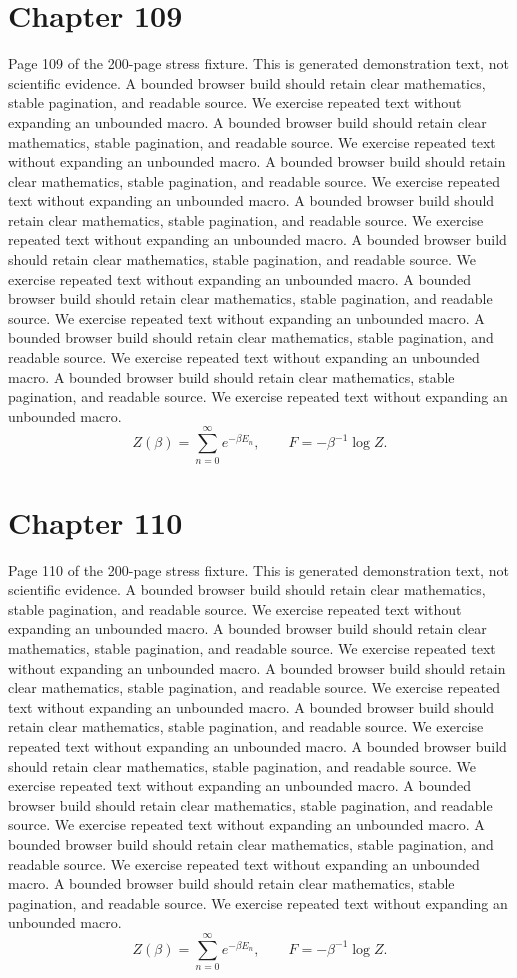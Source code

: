 \documentclass[11pt]{article}
\begin{document}
\section*{Chapter 109}
Page 109 of the 200-page stress fixture. This is generated demonstration text, not scientific evidence.
A bounded browser build should retain clear mathematics, stable pagination, and readable source. We exercise repeated text without expanding an unbounded macro.
A bounded browser build should retain clear mathematics, stable pagination, and readable source. We exercise repeated text without expanding an unbounded macro.
A bounded browser build should retain clear mathematics, stable pagination, and readable source. We exercise repeated text without expanding an unbounded macro.
A bounded browser build should retain clear mathematics, stable pagination, and readable source. We exercise repeated text without expanding an unbounded macro.
A bounded browser build should retain clear mathematics, stable pagination, and readable source. We exercise repeated text without expanding an unbounded macro.
A bounded browser build should retain clear mathematics, stable pagination, and readable source. We exercise repeated text without expanding an unbounded macro.
A bounded browser build should retain clear mathematics, stable pagination, and readable source. We exercise repeated text without expanding an unbounded macro.
A bounded browser build should retain clear mathematics, stable pagination, and readable source. We exercise repeated text without expanding an unbounded macro.
\[Z(\beta)=\sum_{n=0}^{\infty}e^{-\beta E_n},\qquad F=-\beta^{-1}\log Z.\]
\newpage
\section*{Chapter 110}
Page 110 of the 200-page stress fixture. This is generated demonstration text, not scientific evidence.
A bounded browser build should retain clear mathematics, stable pagination, and readable source. We exercise repeated text without expanding an unbounded macro.
A bounded browser build should retain clear mathematics, stable pagination, and readable source. We exercise repeated text without expanding an unbounded macro.
A bounded browser build should retain clear mathematics, stable pagination, and readable source. We exercise repeated text without expanding an unbounded macro.
A bounded browser build should retain clear mathematics, stable pagination, and readable source. We exercise repeated text without expanding an unbounded macro.
A bounded browser build should retain clear mathematics, stable pagination, and readable source. We exercise repeated text without expanding an unbounded macro.
A bounded browser build should retain clear mathematics, stable pagination, and readable source. We exercise repeated text without expanding an unbounded macro.
A bounded browser build should retain clear mathematics, stable pagination, and readable source. We exercise repeated text without expanding an unbounded macro.
A bounded browser build should retain clear mathematics, stable pagination, and readable source. We exercise repeated text without expanding an unbounded macro.
\[Z(\beta)=\sum_{n=0}^{\infty}e^{-\beta E_n},\qquad F=-\beta^{-1}\log Z.\]
\newpage
\end{document}
